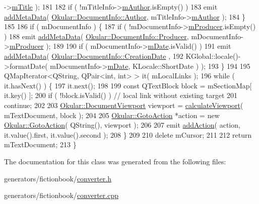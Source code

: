\begin{DoxyCode}
      ->\hyperlink{classConverter_1_1TitleInfo_a19645faf3d93e1588645fa6d50daa69a}{mTitle} );
181 
182         \textcolor{keywordflow}{if} ( !mTitleInfo->\hyperlink{classConverter_1_1TitleInfo_a7ecc1a061f21392a7a3c3daa8792476c}{mAuthor}.isEmpty() )
183             emit \hyperlink{classOkular_1_1TextDocumentConverter_ad6e263857527273c9cf618e16329f6a7}{addMetaData}( \hyperlink{classOkular_1_1DocumentInfo_a3a6e5f7fb246e29bcb2e830b6f770791a1010574d070b1925e030c20fef3e7a35}{Okular::DocumentInfo::Author}, 
      mTitleInfo->\hyperlink{classConverter_1_1TitleInfo_a7ecc1a061f21392a7a3c3daa8792476c}{mAuthor} );
184     \}
185 
186     \textcolor{keywordflow}{if} ( mDocumentInfo ) \{
187         \textcolor{keywordflow}{if} ( !mDocumentInfo->\hyperlink{classConverter_1_1DocumentInfo_a37486c959f5eb91b039b54092aa4eb33}{mProducer}.isEmpty() )
188             emit \hyperlink{classOkular_1_1TextDocumentConverter_ad6e263857527273c9cf618e16329f6a7}{addMetaData}( \hyperlink{classOkular_1_1DocumentInfo_a3a6e5f7fb246e29bcb2e830b6f770791a4781bb7ac85d4fe7bdc448097aa1c48c}{Okular::DocumentInfo::Producer}, 
      mDocumentInfo->\hyperlink{classConverter_1_1DocumentInfo_a37486c959f5eb91b039b54092aa4eb33}{mProducer} );
189 
190         \textcolor{keywordflow}{if} ( mDocumentInfo->\hyperlink{classConverter_1_1DocumentInfo_a5a6937c62c571c7c757aa753012a24ca}{mDate}.isValid() )
191             emit \hyperlink{classOkular_1_1TextDocumentConverter_ad6e263857527273c9cf618e16329f6a7}{addMetaData}( \hyperlink{classOkular_1_1DocumentInfo_a3a6e5f7fb246e29bcb2e830b6f770791a58a72aeacd3cb08e85d0f9f19b2fe83a}{Okular::DocumentInfo::CreationDate}
      ,
192                       KGlobal::locale()->formatDate( mDocumentInfo->\hyperlink{classConverter_1_1DocumentInfo_a5a6937c62c571c7c757aa753012a24ca}{mDate}, KLocale::ShortDate ) );
193     \}
194 
195     QMapIterator<QString, QPair<int, int> > it( mLocalLinks );
196     \textcolor{keywordflow}{while} ( it.hasNext() ) \{
197         it.next();
198 
199         \textcolor{keyword}{const} QTextBlock block = mSectionMap[ it.key() ];
200         \textcolor{keywordflow}{if} ( !block.isValid() ) \textcolor{comment}{// local link without existing target}
201           \textcolor{keywordflow}{continue};
202 
203         \hyperlink{classOkular_1_1DocumentViewport}{Okular::DocumentViewport} viewport = 
      \hyperlink{classOkular_1_1TextDocumentConverter_a5d8709540be1213da6dac78759ce7172}{calculateViewport}( mTextDocument, block );
204 
205         \hyperlink{classOkular_1_1GotoAction}{Okular::GotoAction} *action = \textcolor{keyword}{new} \hyperlink{classOkular_1_1GotoAction}{Okular::GotoAction}( QString(),
       viewport );
206 
207         emit \hyperlink{classOkular_1_1TextDocumentConverter_ac4f1b668547e87affede3663ea6d8bc6}{addAction}( action, it.value().first, it.value().second );
208     \}
209 
210     \textcolor{keyword}{delete} mCursor;
211 
212     \textcolor{keywordflow}{return} mTextDocument;
213 \}
\end{DoxyCode}


The documentation for this class was generated from the following files\+:\begin{DoxyCompactItemize}
\item 
generators/fictionbook/\hyperlink{fictionbook_2converter_8h}{converter.\+h}\item 
generators/fictionbook/\hyperlink{fictionbook_2converter_8cpp}{converter.\+cpp}\end{DoxyCompactItemize}
